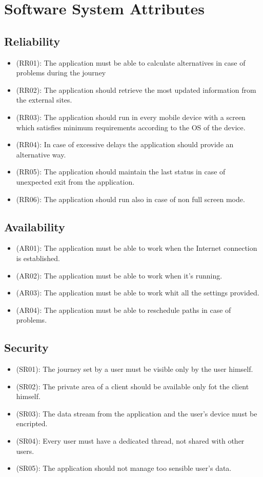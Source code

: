 \documentclass[a4paper,leqno]{book}
\begin{document}
\section{Software System Attributes}

\subsection{Reliability}
\begin{itemize}
\item (RR01): The application must be able to calculate alternatives in case of problems during the journey
\item (RR02): The application should retrieve the most updated information from the external sites.
\item (RR03): The application should run in every mobile device with a screen which satisfies minimum requirements according to the OS of the device.
\item (RR04): In case of excessive delays the application should provide an alternative way.
\item (RR05): The application should maintain the last status in case of unexpected exit from the application.
\item (RR06): The application should run also in case of non full screen mode.
\end{itemize}

\subsection{Availability}
\begin{itemize}
\item (AR01): The application must be able to work when the Internet connection is established.
\item (AR02): The application must be able to work when it's running.
\item (AR03): The application must be able to work whit all the settings provided.
\item (AR04): The application must be able to reschedule paths in case of problems.
\end{itemize}

\subsection{Security}
\begin{itemize}
\item (SR01): The journey set by a user must be visible only by the user himself.
\item (SR02): The private area of a client should be available only fot the client himself.
\item (SR03): The data stream from the application and the user's device must be encripted.
\item (SR04): Every user must have a dedicated thread, not shared with other users.
\item (SR05): The application should not manage too sensible user's data.
\end{itemize}
\end{document}
